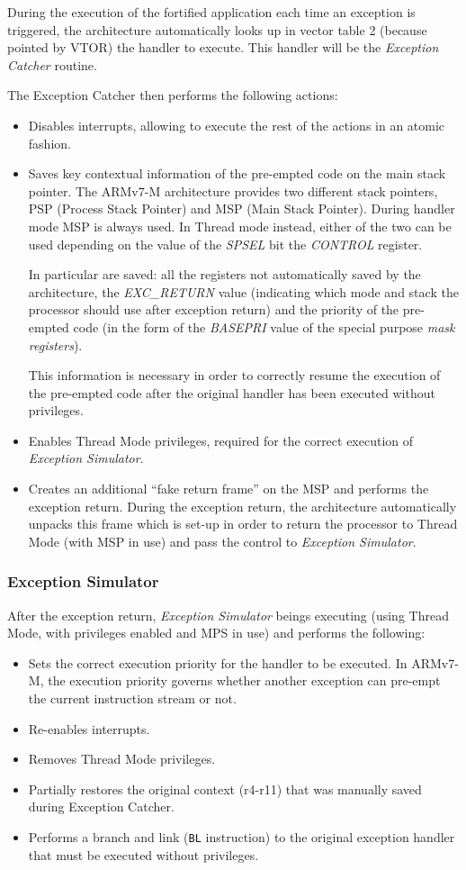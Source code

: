 \documentclass{article}
\begin{document}
During the execution of the fortified application each time an exception is triggered, the architecture automatically looks up in vector table 2 (because pointed by VTOR) the handler to execute. This handler will be the \textit{Exception Catcher} routine.

The Exception Catcher then performs the following actions:
\begin{itemize}
	\item Disables interrupts, allowing to execute the rest of the actions in an atomic fashion.
	\item Saves key contextual information of the pre-empted code on the main stack pointer. The ARMv7-M architecture provides two different stack pointers, PSP (Process Stack Pointer) and MSP (Main Stack Pointer). During handler mode MSP is always used. In Thread mode instead, either of the two can be used depending on the value of the \textit{SPSEL} bit the \textit{CONTROL} register.
	
	In particular are saved: all the registers not automatically saved by the architecture, the \textit{EXC\_RETURN} value (indicating which mode and stack the processor should use after exception return) and the priority of the pre-empted code (in the form of the \textit{BASEPRI} value of the special purpose \textit{mask registers}).
	
	This information is necessary in order to correctly resume the execution of the pre-empted code after the original handler has been executed without privileges.
	\item Enables Thread Mode privileges, required for the correct execution of \textit{Exception Simulator}.
	\item Creates an additional ``fake return frame'' on the MSP and performs the exception return. During the exception return, the architecture automatically unpacks this frame which is set-up in order to return the processor to Thread Mode (with MSP in use) and pass the control to \textit{Exception Simulator}.
\end{itemize}

\subsubsection{Exception Simulator}
After the exception return, \textit{Exception Simulator} beings executing (using Thread Mode, with privileges enabled and MPS in use) and performs the following:
\begin{itemize}
	\item Sets the correct execution priority for the handler to be executed. In ARMv7-M, the execution priority governs whether another exception can pre-empt the current instruction stream or not.
	\item Re-enables interrupts.
	\item Removes Thread Mode privileges.
	\item Partially restores the original context (r4-r11) that was manually saved during Exception Catcher.
	\item Performs a branch and link (\verb|BL| instruction) to the original exception handler that must be executed without privileges.
\end{itemize}
\end{document}

